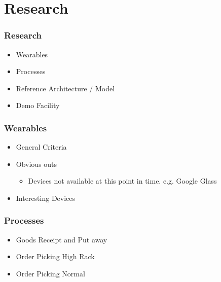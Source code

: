 \section{Research}
\begin{frame}\frametitle{Research}
	\begin{itemize}
		\item Wearables
		\item Processes
		\item Reference Architecture / Model
		\item Demo Facility
	\end{itemize}
\end{frame}

\begin{frame}\frametitle{Wearables}
	\begin{itemize}
		\item General Criteria
		\item Obvious outs
		\begin{itemize}
			\item Devices not available at this point in time. e.g. Google Glass
		\end{itemize}
		\item Interesting Devices
	\end{itemize}
\end{frame}

\begin{frame}\frametitle{Processes}
	\begin{itemize}
		\item Goods Receipt and Put away
		\item Order Picking High Rack
		\item Order Picking Normal
	\end{itemize}
\end{frame}
